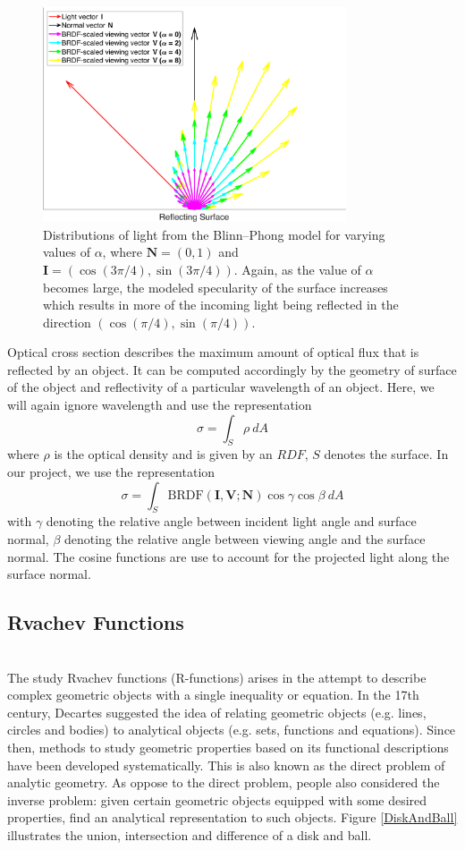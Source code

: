 \documentclass[11pt]{amsart}
\newcommand{\BRDF}{\mathrm{BRDF}}
\theoremstyle{definition}
\begin{document}
\begin{figure}[H]
 \includegraphics[width=0.8\textwidth]{./figs/BRDF_Vectors.pdf}
 \caption{Distributions of light from the Blinn--Phong model for varying values of $\alpha$, where $\mathbf{N} = (0,1)$ and $\mathbf{I} = (\cos(3\pi/4),\sin(3\pi/4))$. Again, as the value of $\alpha$ becomes large, the modeled specularity of the surface increases which results in more of the incoming light being reflected in the direction $(\cos(\pi/4),\sin(\pi/4))$.}
 \label{BRDFVectors}
\end{figure}

Optical cross section describes the maximum amount of optical flux that is reflected by an object. It can be computed accordingly by the geometry of surface of the object and reflectivity of a particular wavelength of an object. Here, we will again ignore wavelength and use the representation 
$$\sigma=\int_{S} \rho \: dA$$
where $\rho$ is the optical density and is given by an $RDF$, $S$ denotes the surface. In our project, we use the representation
$$\sigma= \int_S\BRDF(\mathbf{I},\mathbf{V};\mathbf{N}) \cos\gamma\cos\beta \: dA$$
with $\gamma$ denoting the relative angle between incident light angle and surface normal, $\beta$ denoting the relative angle between viewing angle and the surface normal. The cosine functions are use to account for the projected light along the surface normal. 

\subsection{Rvachev Functions}~\\
The study Rvachev functions (R-functions) arises in the attempt
to describe complex geometric objects with a single inequality or equation. In the
17th century, Decartes suggested the idea of relating geometric objects (e.g.
lines, circles and bodies) to analytical objects (e.g. sets, functions and
equations). Since then, methods to study geometric properties based on its
functional descriptions have been developed systematically. This is also known
as the direct problem of analytic geometry. As oppose to the direct problem,
people also considered the inverse problem: given certain geometric objects
equipped with some desired properties, find an analytical representation to
such objects. Figure \ref{DiskAndBall} illustrates the union, intersection and difference of a disk and ball. 
\end{document}
